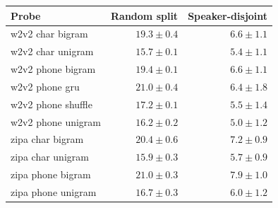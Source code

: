 \begin{tabular}{lrr}
\toprule
Probe & Random split & Speaker-disjoint \\
\midrule
w2v2 char bigram & $19.3 \pm 0.4$ & $6.6 \pm 1.1$ \\
w2v2 char unigram & $15.7 \pm 0.1$ & $5.4 \pm 1.1$ \\
w2v2 phone bigram & $19.4 \pm 0.1$ & $6.6 \pm 1.1$ \\
w2v2 phone gru & $21.0 \pm 0.4$ & $6.4 \pm 1.8$ \\
w2v2 phone shuffle & $17.2 \pm 0.1$ & $5.5 \pm 1.4$ \\
w2v2 phone unigram & $16.2 \pm 0.2$ & $5.0 \pm 1.2$ \\
zipa char bigram & $20.4 \pm 0.6$ & $7.2 \pm 0.9$ \\
zipa char unigram & $15.9 \pm 0.3$ & $5.7 \pm 0.9$ \\
zipa phone bigram & $21.0 \pm 0.3$ & $7.9 \pm 1.0$ \\
zipa phone unigram & $16.7 \pm 0.3$ & $6.0 \pm 1.2$ \\
\bottomrule
\end{tabular}
